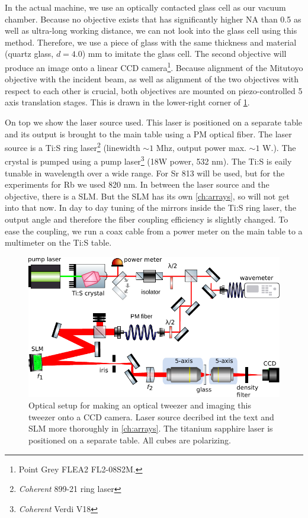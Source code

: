 In the actual machine, we use an optically contacted glass cell as our vacuum chamber. Because no objective exists that has significantly higher NA than 0.5 as well as ultra-long working distance, we can not look into the glass cell using this method. Therefore, we use a piece of glass with the same thickness and material (quartz glass, $d = 4.0$) mm to imitate the glass cell. The second objective will produce an image onto a linear CCD camera\footnote{Point Grey FLEA2 FL2-08S2M.}. Because alignment of the Mitutoyo objective with the incident beam, as well as alignment of the two objectives with respect to each other is crucial, both objectives are mounted on piezo-controlled 5 axis translation stages. 
This is drawn in the lower-right corner of \cref{fig:TiSandSLMsetup}.

On top we show the laser source used.
This laser is positioned on a separate table and its output is brought to the main table using a \ac{PM} optical fiber. 
The laser source is a \ac{Ti:S} ring laser\footnote{\textit{Coherent} 899-21 ring laser} (linewidth $\sim 1$ Mhz, output power max. $\sim 1$ W.). 
The crystal is pumped using a pump laser\footnote{\textit{Coherent} Verdi V18} (18W power, 532 nm). 
The \ac{Ti:S} is eaily tunable in wavelength over a wide range. For Sr 813 will be used, but for the experiments for Rb we used 820 nm. 
In between the laser source and the objective, there is a \ac{SLM}. But the SLM has its own \cref{ch:arrays}, so will not get into that now. 
In day to day tuning of the mirrors inside the Ti:S ring laser, the output angle and therefore the fiber coupling efficiency is slightly changed. 
To ease the coupling, we run a coax cable from a power meter on the main table to a multimeter on the Ti:S table. 

\begin{figure}
    \centering
    \includegraphics[width=0.9\linewidth]{figures/TiSandSLM.pdf}
    \caption{Optical setup for making an optical tweezer and imaging this tweezer onto a CCD camera. 
    Laser source decribed int the text and \ac{SLM} more thoroughly in \cref{ch:arrays}.
    The titanium sapphire laser is positioned on a separate table. 
    All cubes are polarizing.}
    \label{fig:TiSandSLMsetup}
\end{figure}


